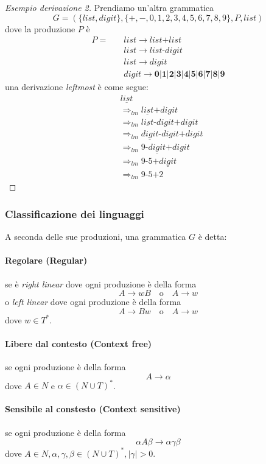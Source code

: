 \begin{proof}[Esempio derivazione 2]
Prendiamo un'altra grammatica
$$G=(\{list,digit\},\{+,-,0,1,2,3,4,5,6,7,8,9\},P,list)$$ dove la produzione $P$
è
\begin{align*}
P =  \quad
& list \to list \textbf{+} list \\
& list \to list \textbf{-} digit \\
& list \to digit \\
& digit \to \textbf{0}|\textbf{1}|\textbf{2}|\textbf{3}|\textbf{4}|\textbf{5}|
\textbf{6}|\textbf{7}|\textbf{8}|\textbf{9}
\end{align*}
una derivazione \textit{leftmost} è come segue:
\begin{align*}
& \underline{list} \\
& \Rightarrow_{lm} \underline{list} \textbf{+} digit \\
& \Rightarrow_{lm} \underline{list} \textbf{-} digit \textbf{+} digit \\
& \Rightarrow_{lm} \underline{digit} \textbf{-} digit \textbf{+} digit \\
& \Rightarrow_{lm} 9 \textbf{-} \underline{digit} \textbf{+} digit \\
& \Rightarrow_{lm} 9 \textbf{-} 5 \textbf{+} \underline{digit} \\
& \Rightarrow_{lm} 9 \textbf{-} 5 \textbf{+} 2
\end{align*}
\end{proof}

\subsubsection{Classificazione dei linguaggi}
\label{sec:classificazione_linguaggi}
A seconda delle sue produzioni, una grammatica $G$ è detta:
\paragraph{Regolare (\textbf{Regular})}
se è \textit{right linear} dove ogni produzione è della forma
$$A \to wB \quad \text{o} \quad A \to w$$
o \textit{left linear} dove ogni produzione è della forma
$$A \to Bw \quad \text{o} \quad A \to w$$
dove $w \in T^*$.
\paragraph{Libere dal contesto (\textbf{Context free})}
se ogni produzione è della forma $$A \to \alpha$$ dove $A \in N$ e $\alpha \in
(N \cup T)^*$.
\paragraph{Sensibile al constesto (\textbf{Context sensitive})}
se ogni produzione è della forma $$\alpha A \beta \to \alpha \gamma \beta$$
dove $A \in N, \alpha,\gamma,\beta \in (N \cup T)^*, |\gamma| > 0$.

